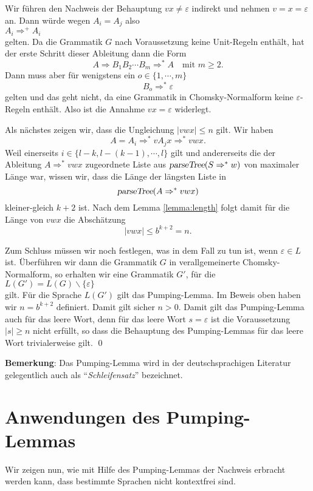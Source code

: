 Wir f\"uhren den Nachweis der Behauptung $vx \not= \varepsilon$ indirekt und nehmen $v = x =
\varepsilon$ an.
Dann w\"urde wegen $A_i = A_j$ also
\\[0.2cm]
\hspace*{1.3cm}
$A_i \Rightarrow^+ A_i$
\\[0.2cm]
gelten. 
Da die Grammatik $G$ nach Voraussetzung keine Unit-Regeln enth\"alt, hat der erste 
Schritt dieser Ableitung dann die Form
\[ A \Rightarrow B_1 B_2 \cdots B_m \Rightarrow^* A \quad \mbox{mit $m \geq 2$}. \] 
Dann muss aber f\"ur wenigstens ein $o \in \{1, \cdots, m\}$
\[ B_o \Rightarrow^* \varepsilon  \]
gelten und das geht nicht, da eine Grammatik in Chomsky-Normalform keine $\varepsilon$-Regeln
enth\"alt.  Also ist die Annahme $vx = \varepsilon$ widerlegt.

Als n\"achstes zeigen wir, dass die Ungleichung $|vwx| \leq n$ gilt.  Wir haben
\[ A = A_i \Rightarrow^* vA_jx \Rightarrow^* vwx. \]
Weil einerseits $i \in \{l-k, l-(k-1), \cdots,l \}$ gilt und andererseits die der
Ableitung
$A \Rightarrow^* vwx$ zugeordnete Liste aus $\textsl{parseTree}(S \Rightarrow^* w)$ von
maximaler L\"ange war, wissen wir, 
dass die L\"ange der l\"angsten Liste in 
\[ \textsl{parseTree}(A \Rightarrow^* vwx) \]
kleiner-gleich  $k+2$ ist.
  Nach dem Lemma
\ref{lemma:length} folgt damit f\"ur die L\"ange von $vwx$ die Absch\"atzung
\[ |vwx| \leq b^{k+2} = n. \]

Zum Schluss m\"ussen wir noch festlegen, was in dem Fall zu tun ist, wenn $\varepsilon \in L$ ist.  
\"Uberf\"uhren wir dann die Grammatik $G$ in verallgemeinerte Chomsky-Normalform, so erhalten wir eine
Grammatik $G'$, f\"ur die
\\[0.2cm]
\hspace*{1.3cm}
$L(G') = L(G) \backslash \{\varepsilon\}$
\\[0.2cm]
gilt.  F\"ur die Sprache $L(G')$ gilt das Pumping-Lemma.  Im Beweis oben haben wir $n = b^{k+2}$
definiert. Damit gilt sicher $n > 0$.  Damit gilt das Pumping-Lemma auch f\"ur das leere Wort, denn
f\"ur das leere Wort $s = \varepsilon$ ist die Voraussetzung $|s| \geq n$
nicht erf\"ullt, so dass die Behauptung des  Pumping-Lemmas f\"ur das leere Wort trivialerweise gilt.
\qed
\vspace*{0.2cm}

\noindent
\textbf{Bemerkung}: Das Pumping-Lemma wird in der deutschsprachigen Literatur gelegentlich auch als 
``\emph{Schleifensatz}'' bezeichnet. 

\section{Anwendungen des Pumping-Lemmas}
Wir zeigen nun, wie mit Hilfe des Pumping-Lemmas der Nachweis erbracht werden kann, dass
bestimmte Sprachen nicht kontextfrei sind.

